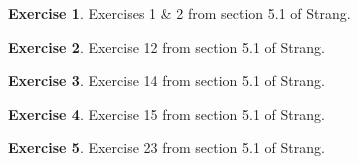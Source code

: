 \documentclass[11pt]{amsart}
\theoremstyle{definition}
\newtheorem{exercise}{Exercise}
\begin{document}
\begin{exercise}
Exercises 1 \& 2 from section 5.1 of Strang.
\end{exercise}

\begin{exercise}
Exercise 12 from section 5.1 of Strang.
\end{exercise}

\begin{exercise}
Exercise 14 from section 5.1 of Strang.
\end{exercise}

\begin{exercise}
Exercise 15 from section 5.1 of Strang.
\end{exercise}

\begin{exercise}
Exercise 23 from section 5.1 of Strang.
\end{exercise}
\end{document}
